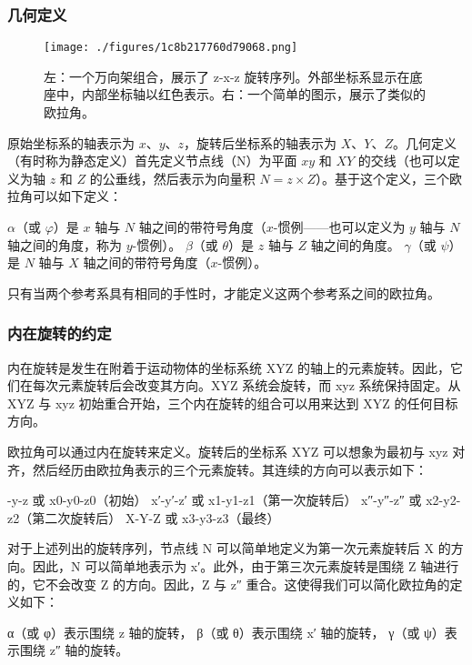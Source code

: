 \subsubsection{几何定义}  
\begin{figure}[ht]
\centering
\texttt{[image: ./figures/1c8b217760d79068.png]}
\caption{左：一个万向架组合，展示了 z-x-z 旋转序列。外部坐标系显示在底座中，内部坐标轴以红色表示。右：一个简单的图示，展示了类似的欧拉角。} \label{fig_OLJ_2}
\end{figure}
原始坐标系的轴表示为 \(x\)、\(y\)、\(z\)，旋转后坐标系的轴表示为 \(X\)、\(Y\)、\(Z\)。几何定义（有时称为静态定义）首先定义节点线（N）为平面 \(xy\) 和 \(XY\) 的交线（也可以定义为轴 \(z\) 和 \(Z\) 的公垂线，然后表示为向量积 \(N = z \times Z\)）。基于这个定义，三个欧拉角可以如下定义：

\(\alpha\)（或 \(\varphi\)）是 \(x\) 轴与 \(N\) 轴之间的带符号角度（\(x\)-惯例——也可以定义为 \(y\) 轴与 \(N\) 轴之间的角度，称为 \(y\)-惯例）。  
\(\beta\)（或 \(\theta\)）是 \(z\) 轴与 \(Z\) 轴之间的角度。  
\(\gamma\)（或 \(\psi\)）是 \(N\) 轴与 \(X\) 轴之间的带符号角度（\(x\)-惯例）。  

只有当两个参考系具有相同的手性时，才能定义这两个参考系之间的欧拉角。

\subsubsection{内在旋转的约定}
内在旋转是发生在附着于运动物体的坐标系统 XYZ 的轴上的元素旋转。因此，它们在每次元素旋转后会改变其方向。XYZ 系统会旋转，而 xyz 系统保持固定。从 XYZ 与 xyz 初始重合开始，三个内在旋转的组合可以用来达到 XYZ 的任何目标方向。

欧拉角可以通过内在旋转来定义。旋转后的坐标系 XYZ 可以想象为最初与 xyz 对齐，然后经历由欧拉角表示的三个元素旋转。其连续的方向可以表示如下：

\x-y-z 或 x0-y0-z0（初始）  
x′-y′-z′ 或 x1-y1-z1（第一次旋转后）  
x″-y″-z″ 或 x2-y2-z2（第二次旋转后）  
X-Y-Z 或 x3-y3-z3（最终）

对于上述列出的旋转序列，节点线 N 可以简单地定义为第一次元素旋转后 X 的方向。因此，N 可以简单地表示为 x′。此外，由于第三次元素旋转是围绕 Z 轴进行的，它不会改变 Z 的方向。因此，Z 与 z″ 重合。这使得我们可以简化欧拉角的定义如下：

α（或 φ）表示围绕 z 轴的旋转，  
β（或 θ）表示围绕 x′ 轴的旋转，  
γ（或 ψ）表示围绕 z″ 轴的旋转。
